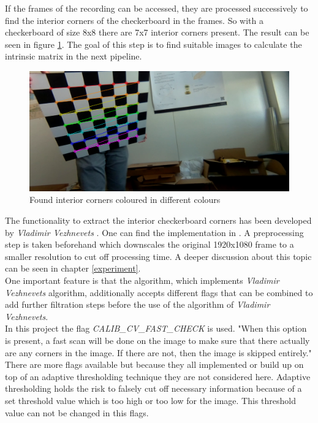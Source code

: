 If the frames of the recording can be accessed, they are processed successively to find the interior corners of the checkerboard in the frames. So with a checkerboard of size 8x8 there are 7x7 interior corners present. \cite{cv} The result can be seen in figure \ref{fig:colour_corners}. The goal of this step is to find suitable images to calculate the intrinsic matrix in the next pipeline.\\

\begin{figure}[H]
    \centering
    \includegraphics[width=.8\textwidth]{image/2/colour_corners.png}
    \caption{Found interior corners coloured in different colours}
    \label{fig:colour_corners}
\end{figure}

The functionality to extract the interior checkerboard corners has been developed by \textit{Vladimir Vezhnevets} \cite{vezhnevets}. One can find the implementation in \cite{vez_2}. A preprocessing step is taken beforehand which downscales the original 1920x1080 frame to a smaller resolution to cut off processing time. A deeper discussion about this topic can be seen in chapter \ref{experiment}.\\

One important feature is that the algorithm, which implements \textit{Vladimir Vezhnevets} algorithm, additionally accepts different flags that can be combined to add further filtration steps before the use of the algorithm of \textit{Vladimir Vezhnevets}. \cite{cv}\\

In this project the flag \textit{CALIB\_CV\_FAST\_CHECK} is used. "When this option is present, a fast scan will be done on the image to make sure that there actually are any corners in the image. If there are not, then the image is skipped entirely." \cite{cv} There are more flags available but because they all implemented or build up on top of an adaptive thresholding technique they are not considered here. Adaptive thresholding holds the risk to falsely cut off necessary information because of a set threshold value which is too high or too low for the image. This threshold value can not be changed in this flags. \\

